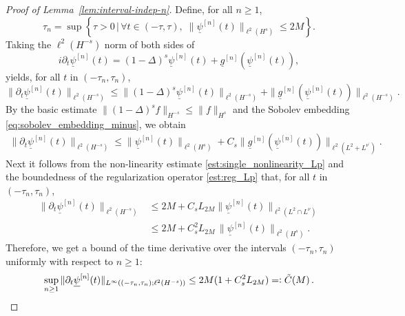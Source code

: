\documentclass[10pt,a4paper]{amsart}
\newcommand{\Clip}[1]{L_{#1}}
\newcommand{\ulg}{\underline{g}}
\newcommand{\ulpsi}{\underline{\psi}}
\begin{document}
	\begin{proof}[Proof of Lemma~\ref{lem:interval-indep-n}]
		Define, for all $ n \geq 1$, 
		\begin{equation}\label{def:taun}
			\tau_n = \sup \left\{ \tau >0 \,\Big|\, \forall t \in (-\tau, \tau), \; \| \ulpsi^{[n]}(t) \|_{\ell^2(H^{s})} \leq 2M  \right\} .
		\end{equation}
		Taking the $\ell^2(H^{-s})$ norm of both sides of
		\begin{equation*}
			i \partial_t \ulpsi^{[n]}(t) = (1-\Delta)^s \ulpsi^{[n]}(t) +  \ulg^{[n]}(\ulpsi^{[n]}(t)) ,
		\end{equation*}
		yields, for all $t$ in  $(-\tau_n, \tau_n) $,
		\begin{equation*}
			\| \partial_t \ulpsi^{[n]}(t) \|_{\ell^2(H^{-s})} 
			\leq  \| (1-\Delta)^s \ulpsi^{[n]}(t) \|_{\ell^2(H^{-s})}
			+  \|  \ulg^{[n]}(\ulpsi^{[n]}(t)) \|_{\ell^2(H^{-s})} .
		\end{equation*}
		By the basic estimate $ \| (1-\Delta)^s f \|_{H^{-s}} \leq \| f \|_{H^{s}} $ and the Sobolev embedding \eqref{eq:sobolev_embedding_minus}, we obtain
		\begin{align*}
			\| \partial_t \ulpsi^{[n]}(t) \|_{\ell^2(H^{-s})} \leq \|  \ulpsi^{[n]}(t) \|_{\ell^2(H^{s})}
			+  C_{s} \| \ulg^{[n]}(\ulpsi^{[n]}(t)) \|_{\ell^2(L^2+L^{\nu^\prime})} .
		\end{align*}
		Next it follows from the non-linearity estimate \eqref{est:single_nonlinearity_Lp} and the boundedness of the regularization operator \eqref{est:reg_Lp} that, for all $t$ in $(-\tau_n, \tau_n) $,
		\begin{align*}
			\| \partial_t \ulpsi^{[n]}(t) \|_{\ell^2(H^{-s})} 
			& \leq  2M 
			+  C_{s} \Clip{2M}  \| \ulpsi^{[n]}(t) \|_{\ell^2(L^2\cap L^\nu)}  \\
			& \leq  2M + C_{s}^2 \Clip{2M} \, \| \ulpsi^{[n]}(t) \|_{\ell^2(H^s)}  .
		\end{align*}
		Therefore, we get a bound of the time derivative over the intervals $ (-\tau_n,\tau_n)$ uniformly with respect to $ n \geq 1$:
		\begin{equation}\label{eq:b0}
			\sup_{n \geq 1} \| \partial_t \ulpsi^{[n]}(t) \|_{L^{\infty}((-\tau_n,\tau_n);\ell^2(H^{-s}))} \leq 2M(1 +  C_s^2  \Clip{2M}  ) = \vcentcolon \tilde{C}(M) \,.
		\end{equation}

\end{proof}
\end{document}
